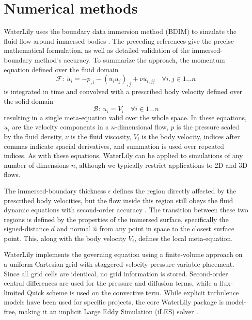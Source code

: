 \documentclass[10pt,a4paper]{article}
\begin{document}
\section{Numerical methods}\label{sec:numerical_methods}
WaterLily uses the boundary data immersion method (BDIM) to simulate the fluid flow around immersed bodies \citep{Weymouth2011,Maertens2014,Lauber2022}. The preceding references give the precise mathematical formulation, as well as detailed validation of the immersed-boundary method's accuracy. To summarize the approach, the momentum equation defined over the fluid domain
\begin{equation}
    \mathcal{\dot F}:\ \dot u_i = -p_{,i} - (u_i u_j)_{,j}+\nu u_{i,jj} \quad \forall i,j \in 1\ldots n
\end{equation}
is integrated in time and convolved with a prescribed body velocity defined over the solid domain
\begin{equation}
    \mathcal{B}:\ u_i = V_i \quad \forall i \in 1\ldots n
\end{equation}
resulting in a single meta-equation valid over the whole space. In these equations, $u_i$ are the velocity components in a $n$-dimensional flow, $p$ is the pressure scaled by the fluid density, $\nu$ is the fluid viscosity, $V_i$ is the body velocity, indices after commas indicate spacial derivatives, and summation is used over repeated indices. As with these equations, WaterLily can be applied to simulations of any number of dimensions $n$, although we typically restrict applications to 2D and 3D flows.

The immersed-boundary thickness $\epsilon$ defines the region directly affected by the prescribed body velocities, but the flow inside this region still obeys the fluid dynamic equations with second-order accuracy \citep{Maertens2014}. The transition between these two regions is defined by the properties of the immersed surface, specifically the signed-distance $d$ and normal $\hat n$ from any point in space to the closest surface point. This, along with the body velocity $V_i$, defines the local meta-equation.

WaterLily implements the governing equation using a finite-volume approach on a uniform Cartesian grid with staggered velocity-pressure variable placement. Since all grid cells are identical, no grid information is stored. Second-order central differences are used for the pressure and diffusion terms, while a flux-limited Quick scheme is used on the convective term. While explicit turbulence models have been used for specific projects, the core WaterLily package is model-free, making it an implicit Large Eddy Simulation (iLES) solver \citep{Margolin2006}.
\end{document}
